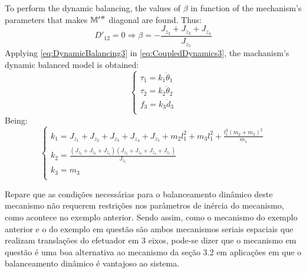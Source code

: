 \documentclass[a4paper,11pt,brazil,fleqn]{article}
\begin{document}
To perform the dynamic balancing, the values of $\beta$ in function of the mechanism's parameters that makes ${\mathbb{M}'}^{\scriptscriptstyle \#}$ diagonal are found. Thus:
\begin{equation}\label{eq:DynamicBalancing3}
D'_{12} = 0 \Rightarrow \beta = -\frac{J_{z_2}+J_{z_3}+J_{z_4}}{J_{z_5}}
\end{equation}
Applying \eqref{eq:DynamicBalancing3} in \eqref{eq:CoupledDynamics3}, the machanism's dynamic balanced model is obtained: 
\begin{equation}\label{eq:DynamicBalanced3}
\begin{cases}
\tau_1 = k_1 \ddot{\theta}_1 \\
\tau_2 = k_2 \ddot{\theta}_2 \\
f_3 = k_3 \ddot{d}_3 \\
\end{cases}
\end{equation}
Being:
\begin{equation}\label{eq:DynamicBalancedKs3}
\begin{cases}
k_1 = J_{z_1} + J_{z_2} + J_{z_3} + J_{z_4} + J_{z_5} + m_2 l_1^2 + m_3 l_1^2 + \frac{l_1^2 (m_2 + m_3)^2}{m_1} \\
k_2 = \frac{(J_{z_2}+J_{z_3}+J_{z_4})(J_{z_2}+J_{z_3}+J_{z_4}+J_{z_5})}{J_{z_5}} \\
k_3 = m_3 \\
\end{cases}
\end{equation}

Repare que as condi\c{c}\~oes necess\'{a}rias para o balanceamento din\^{a}mico deste mecanismo n\~{a}o requerem restri\c{c}\~{o}es nos par\^{a}metros de in\'{e}rcia do mecanismo, como acontece no exemplo anterior. Sendo assim, como o mecanismo do exemplo anterior e o do exemplo em quest\~{a}o s\~{a}o ambos mecanismos seriais espaciais que realizam transla\c{c}\~{o}es do efetuador em 3 eixos, pode-se dizer que o mecanismo em quest\~{a}o \'{e} uma boa alternativa ao mecanismo da se\c{c}\~{a}o 3.2 em aplica\c{c}\~{o}es em que o balanceamento din\^{a}mico \'{e} vantajoso ao sistema.

\end{document}
